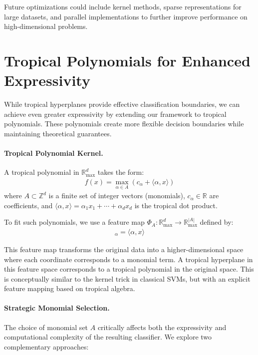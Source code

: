 \documentclass{article}
\newcommand{\R}{\mathbb{R}}
\newcommand{\Rmax}{\mathbb{R}_{\max}}
\begin{document}
Future optimizations could include kernel methods, sparse representations for large datasets, and parallel implementations to further improve performance on high-dimensional problems.

\section{Tropical Polynomials for Enhanced Expressivity}\label{sec:polynomials}

While tropical hyperplanes provide effective classification boundaries, we can achieve even greater expressivity by extending our framework to tropical polynomials. These polynomials create more flexible decision boundaries while maintaining theoretical guarantees.

\paragraph{Tropical Polynomial Kernel.}
A tropical polynomial in $\Rmax^d$ takes the form:
\begin{align}
f(x) = \max_{\alpha \in A} (c_\alpha + \langle \alpha, x \rangle)
\end{align}
where $A \subset \mathbb{Z}^d$ is a finite set of integer vectors (monomials), $c_\alpha \in \R$ are coefficients, and $\langle \alpha, x \rangle = \alpha_1 x_1 + \cdots + \alpha_d x_d$ is the tropical dot product.

To fit such polynomials, we use a feature map $\Phi_A: \Rmax^d \to \Rmax^{|A|}$ defined by:
\begin{align}
[\Phi_A(x)]_\alpha = \langle \alpha, x \rangle
\end{align}

This feature map transforms the original data into a higher-dimensional space where each coordinate corresponds to a monomial term. A tropical hyperplane in this feature space corresponds to a tropical polynomial in the original space. This is conceptually similar to the kernel trick in classical SVMs, but with an explicit feature mapping based on tropical algebra.

\paragraph{Strategic Monomial Selection.}
The choice of monomial set $A$ critically affects both the expressivity and computational complexity of the resulting classifier. We explore two complementary approaches:
\end{document}
